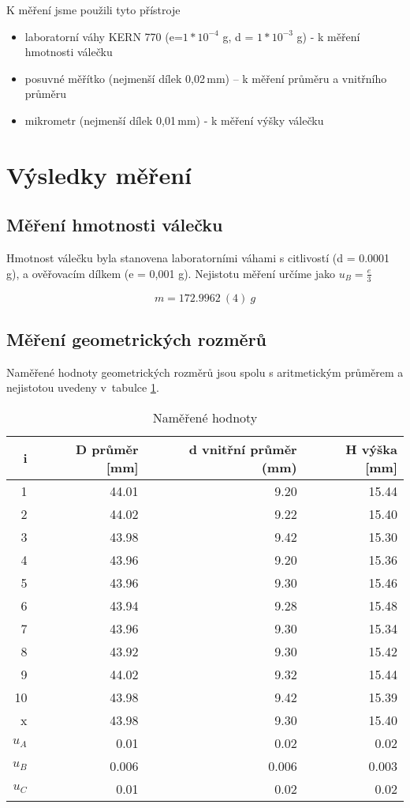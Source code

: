 \documentclass[a4paper,11pt]{article}
\begin{document}
K měření jsme použili tyto přístroje
\begin{itemize}
  \item laboratorní váhy KERN 770 (e=$1 * 10 ^ {-4}$ g, d =  $1 * 10^{-3}$ g) - k měření hmotnosti válečku
    \item posuvné měřítko (nejmenší dílek 0,02\,mm) -- k měření průměru a vnitřního průměru
    \item mikrometr (nejmenší dílek 0,01\,mm) - k měření výšky válečku
\end{itemize}

\section{Výsledky měření}

\subsection{Měření hmotnosti válečku}
Hmotnost válečku byla stanovena laboratorními váhami s citlivostí (d = 0.0001 g), a ověřovacím dílkem (e = 0,001 g). Nejistotu měření určíme jako $u_B = \frac{e}{3}$

\begin{equation}
m = 172.9962\ (4)\ g
\end{equation}

\subsection{Měření geometrických rozměrů}
Naměřené hodnoty geometrických rozměrů jsou spolu s aritmetickým průměrem a nejistotou uvedeny v~tabulce \ref{tb:mer}.


\begin{table}[ht]
\centering
\begin{tabular}{| r | r | r | r |}
\hline
i & D průměr [mm] & d vnitřní průměr (mm) & H výška [mm] \\
\hline\hline
1 & 44.01 & 9.20 & 15.44 \\
2 & 44.02 & 9.22 & 15.40 \\
3 & 43.98 & 9.42 & 15.30 \\
4 & 43.96 & 9.20 & 15.36 \\
5 & 43.96 & 9.30 & 15.46 \\
6 & 43.94 & 9.28 & 15.48 \\
7 & 43.96 & 9.30 & 15.34 \\
8 & 43.92 & 9.30 & 15.42 \\
9 & 44.02 & 9.32 & 15.44 \\
10 & 43.98 & 9.42 & 15.39 \\
\hline\hline
x & 43.98 & 9.30 & 15.40 \\\hline
$u_A$ & 0.01 & 0.02 & 0.02 \\\hline
$u_B$ & 0.006 & 0.006 & 0.003 \\\hline
$u_C$ & 0.01 & 0.02 & 0.02\\\hline
\end{tabular}
\caption{Naměřené hodnoty} 
\label{tb:mer}
\end{table}
\end{document}
